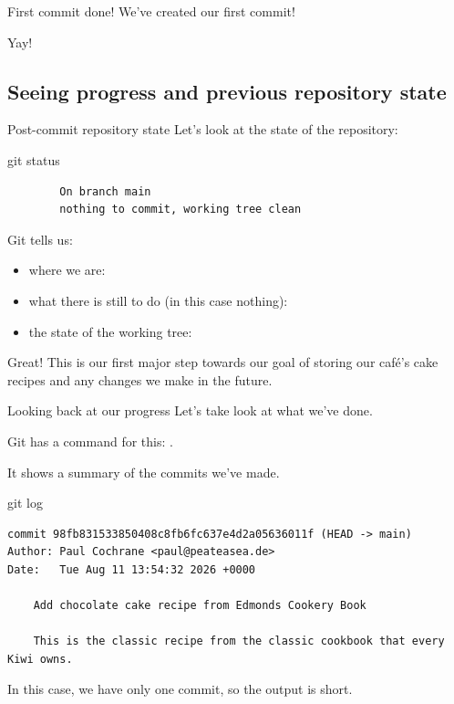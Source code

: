 \documentclass{git_course}
\begin{document}
\begin{frame}[fragile]{First commit done!}
    We've created our first commit!

    Yay!  
\end{frame}

\subsection{Seeing progress and previous repository state}

\begin{frame}[fragile]{Post-commit repository state}
    Let's look at the state of the repository:
    \begin{shellcode}
        git status
    \end{shellcode}
    \begin{verbatim}
        On branch main
        nothing to commit, working tree clean
    \end{verbatim}
    Git tells us:
    \begin{itemize}
        \item where we are: 
        \item what there is still to do (in this case nothing):
        \item the state of the working tree: 
    \end{itemize}

    Great!  This is our first major step towards our goal of storing our
    café's cake recipes and any changes we make in the future.
\end{frame}

\begin{frame}[fragile]{Looking back at our progress}
    Let's take look at what we've done.

    Git has a command for this: .

    It shows a summary of the commits we've made.

    \begin{shellcode}
        git log
    \end{shellcode}
    \begin{verbatim}
commit 98fb831533850408c8fb6fc637e4d2a05636011f (HEAD -> main)
Author: Paul Cochrane <paul@peateasea.de>
Date:   Tue Aug 11 13:54:32 2026 +0000

    Add chocolate cake recipe from Edmonds Cookery Book

    This is the classic recipe from the classic cookbook that every Kiwi owns.
    \end{verbatim}

    In this case, we have only one commit, so the output is short.
\end{frame}
\end{document}
